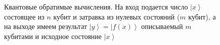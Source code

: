 \begin{figure}
\centering



\caption{Квантовые обратимые вычисления. На вход подается число
  $\left|x\right>$ состоящее из $n$ кубит и затравка из нулевых
  состояний ($m$ кубит), а на выходе имеем результат $\left|y\right> =
  \left|f\left(x\right)\right>$ описываемый $m$ кубитами и исходное
  состояние $\left|x\right>$} 
\label{figQuantCompQuantComp}
\end{figure}
